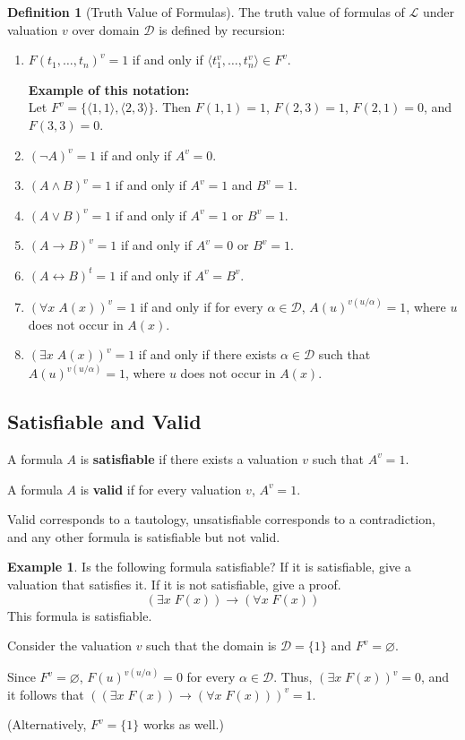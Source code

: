 \documentclass[11pt]{article}
\theoremstyle{definition}
\newtheorem{defn}[thm]{Definition}
\newtheorem{exmp}[thm]{Example}
\begin{document}
\begin{defn}[Truth Value of Formulas]
The truth value of formulas of $\mathcal{L}$ under valuation $v$ over domain $\mathcal{D}$ is defined by recursion:\vspace{-0.25cm}
\begin{enumerate}
    \item $F(t_1, \dots, t_n)^v = 1$ if and only if $\langle t_1^v, \dots, t_n^v \rangle \in F^v$. 
    
    {\bf Example of this notation:} \\ 
    Let $F^v = \{ \langle 1, 1 \rangle, \langle 2, 3 \rangle \}$. Then $F(1, 1) = 1$, $F(2, 3) = 1$, $F(2, 1) = 0$, and $F(3, 3) = 0$.
    \item $(\neg A)^v = 1$ if and only if $A^v = 0$.
    \item $(A \wedge B)^v = 1$ if and only if $A^v = 1$ and $B^v = 1$.
    \item $(A \vee B)^v = 1$ if and only if $A^v = 1$ or $B^v = 1$.
    \item $(A \rightarrow B)^v = 1$ if and only if $A^v = 0$ or $B^v = 1$.
    \item $(A \leftrightarrow B)^t = 1$ if and only if $A^v = B^v$.
    \item $(\forall x \; A(x))^v = 1$ if and only if for every $\alpha \in \mathcal{D}$, $A(u)^{v(u/\alpha)} = 1$, where $u$ does not occur in $A(x)$.
    \item $(\exists x \; A(x))^v = 1$ if and only if there exists $\alpha \in \mathcal{D}$ such that $A(u)^{v(u/\alpha)} = 1$, where $u$ does not occur in $A(x)$.
\end{enumerate}
\end{defn}

\subsection{Satisfiable and Valid}
A formula $A$ is {\bf satisfiable} if there exists a valuation $v$ such that $A^v = 1$.

A formula $A$ is {\bf valid} if for every valuation $v$, $A^v = 1$.

Valid corresponds to a tautology, unsatisfiable corresponds to a contradiction, and any other formula is satisfiable but not valid.

\begin{exmp}
Is the following formula satisfiable? If it is satisfiable, give a valuation that satisfies it. If it is not satisfiable, give a proof.
$$(\exists x \; F(x)) \rightarrow (\forall x \; F(x))$$
This formula is satisfiable.

Consider the valuation $v$ such that the domain is $\mathcal{D} = \{1\}$ and $F^v = \varnothing$. 

Since $F^v = \varnothing$, $F(u)^{v(u/\alpha)} = 0$ for every $\alpha \in \mathcal{D}$. Thus, $(\exists x \; F(x))^v = 0$, and it follows that $((\exists x \; F(x)) \rightarrow (\forall x \; F(x)))^v = 1$.

(Alternatively, $F^v = \{1\}$ works as well.)
\end{exmp}
\end{document}
